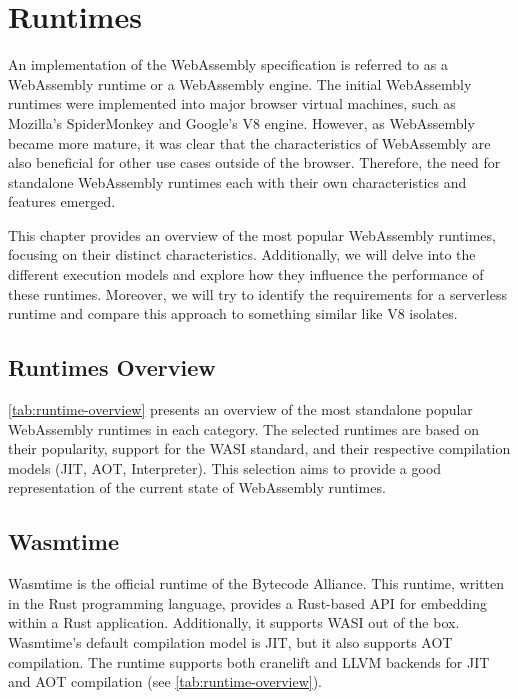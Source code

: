 \chapter{Runtimes}
\label{chap:runtimes}

An implementation of the WebAssembly specification \cite{webassemblycommunitygroup_2023_webassembly} is referred to as a WebAssembly runtime or a WebAssembly engine. The initial WebAssembly runtimes were implemented into major browser virtual machines, such as Mozilla's SpiderMonkey and Google's V8 engine. However, as WebAssembly became more mature, it was clear that the characteristics of WebAssembly are also beneficial for other use cases outside of the browser. Therefore, the need for standalone WebAssembly runtimes each with their own characteristics and features emerged. 

This chapter provides an overview of the most popular WebAssembly runtimes, focusing on their distinct characteristics. Additionally, we will delve into the different execution models and explore how they influence the performance of these runtimes. Moreover, we will try to identify the requirements for a \gls{serverless} runtime and compare this approach to something similar like V8 isolates. 

\section{Runtimes Overview}
\label{sec:runtimes-overview}

\autoref{tab:runtime-overview} presents an overview of the most standalone popular WebAssembly runtimes in each category. The selected runtimes are based on their popularity, support for the WASI standard, and their respective compilation models (JIT, AOT, Interpreter). This selection aims to provide a good representation of the current state of WebAssembly runtimes. 



\section{Wasmtime}
\label{sec:wasmtime}

Wasmtime \cite{bytecodealliance_2022_wasmtime} is the official runtime of the Bytecode Alliance. This runtime, written in the Rust programming language, provides a Rust-based API for embedding within a Rust application. Additionally, it supports WASI out of the box. Wasmtime's default compilation model is JIT, but it also supports AOT compilation. The runtime supports both cranelift and \gls{LLVM} backends for JIT and AOT compilation (see \autoref{tab:runtime-overview}).

